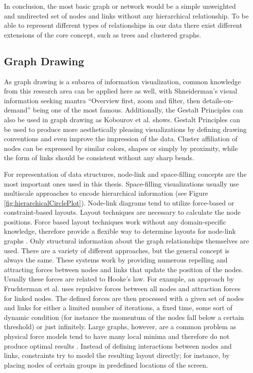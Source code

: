 In conclusion, the most basic graph or network would be a simple unweighted and undirected set of nodes and links without any hierarchical relationship. To be able to represent different types of relationships in our data there exist different extensions of the core concept, such as trees and clustered graphs. 

\subsection{Graph Drawing}

As graph drawing is a subarea of information visualization, common knowledge from this research area can be applied here as well, with Shneiderman's visual information seeking mantra \label{seeking mantra} “Overview first, zoom and filter, then details-on-demand” \cite{shneiderman_eyes_1996} being one of the most famous. Additionally, the Gestalt Principles can also be used in graph drawing as Kobourov et al.
\cite{kobourov_gestalt_2015} shows. Gestalt Principles can be used to produce more aesthetically pleasing visualizations by defining drawing conventions and even improve the impression of the data. Cluster affiliation of nodes can be expressed by similar colors, shapes or simply by proximity, while the form of links should be consistent without any sharp bends.

For representation of data structures, node-link and space-filling concepts are the most important ones used in this thesis. Space-filling visualizations usually use multiscale approaches to encode hierarchical information (see Figure \ref{fig:hierarchicalCirclePlot}). Node-link diagrams tend to utilize force-based or constraint-based layouts\cite{von_landesberger_visual_2011}. Layout techniques are necessary to calculate the node positions. 
Force based\label{exp:force_based_background} layout techniques work without any domain-specific knowledge, therefore provide a flexible way to determine layouts for node-link graphs \cite{kobourov_spring_2012}. Only structural information about the graph relationships themselves are used. 
There are a variety of different approaches, but the general concept is always the same. 
These systems work by providing numerous repelling and attracting forces between nodes and links that update the position of the nodes. Usually these forces are related to Hooke's law. For example, an approach by Fruchterman et al. \cite{fruchterman_graph_1991} uses repulsive forces between all nodes and attraction forces for linked nodes.
The defined forces are then processed with a given set of nodes and links for either a limited number of iterations, a fixed time, some sort of dynamic condition (for instance the momentum of the nodes fall below a certain threshold) or just infinitely.
Large graphs, however, are a common problem as physical force models tend to have many local minima and therefore do not produce optimal results \cite{kobourov_spring_2012}.
Instead of defining interactions between nodes and links, constraints try to model the resulting layout directly; for instance, by placing nodes of certain groups in predefined locations of the screen.   

